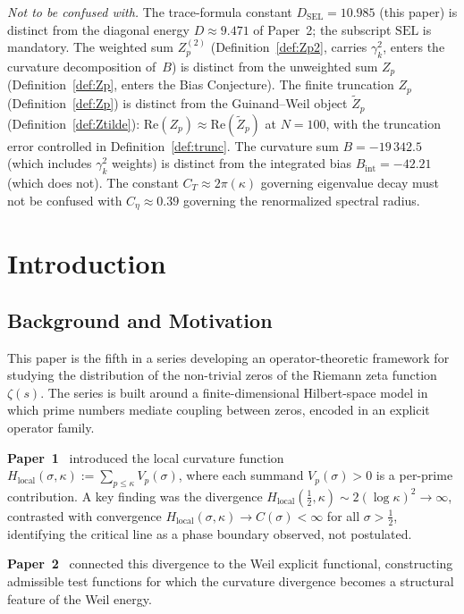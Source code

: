 \documentclass[11pt]{article}
\newcommand{\Hlocal}{H_{\mathrm{local}}}
\newcommand{\Zt}{\widetilde{Z}}
\newcommand{\DSEL}{D_{\mathrm{SEL}}}
\newcommand{\Ceta}{C_{\eta}}
\newcommand{\CT}{C_{T}}
\begin{document}
\medskip
\emph{Not to be confused with.}
The trace-formula constant $\DSEL=10.985$ (this paper) is distinct
from the diagonal energy $D\approx 9.471$ of Paper~2; the subscript
$\mathrm{SEL}$ is mandatory.
The weighted sum $Z_p^{(2)}$ (Definition~\ref{def:Zp2}, carries
$\gamma_k^2$, enters the curvature decomposition of~$B$) is distinct
from the unweighted sum $Z_p$ (Definition~\ref{def:Zp}, enters the
Bias Conjecture).
The finite truncation $Z_p$ (Definition~\ref{def:Zp}) is distinct from
the Guinand--Weil object $\Zt_p$ (Definition~\ref{def:Ztilde}):
$\mathrm{Re}(Z_p)\approx\mathrm{Re}(\Zt_p)$ at $N=100$, with the
truncation error controlled in Definition~\ref{def:trunc}.
The curvature sum $B=-19\,342.5$ (which includes
$\gamma_k^2$ weights) is distinct from the integrated bias
$B_{\mathrm{int}}=-42.21$ (which does not).
The constant $\CT\approx 2\pi(\kappa)$ governing eigenvalue decay
must not be confused with $\Ceta\approx 0.39$ governing the
renormalized spectral radius.

\newpage

\section{Introduction}
\label{sec:intro}

\subsection{Background and Motivation}

This paper is the fifth in a series developing an operator-theoretic
framework for studying the distribution of the non-trivial zeros of the
Riemann zeta function $\zeta(s)$. The series is built around a
finite-dimensional Hilbert-space model in which prime numbers
mediate coupling between zeros, encoded in an explicit operator family.

\textbf{Paper~1}~\cite{Paper1} introduced the local curvature function
$\Hlocal(\sigma,\kappa) := \sum_{p\leq\kappa}V_p(\sigma)$,
where each summand $V_p(\sigma)>0$ is a per-prime contribution.
A key finding was the divergence
$\Hlocal(\tfrac{1}{2},\kappa)\sim 2(\log\kappa)^2\to\infty$,
contrasted with convergence $\Hlocal(\sigma,\kappa)\to C(\sigma)<\infty$
for all $\sigma>\tfrac{1}{2}$, identifying the critical line as a phase
boundary observed, not postulated.

\textbf{Paper~2}~\cite{Paper2} connected this divergence to the Weil
explicit functional, constructing admissible test functions
for which the curvature divergence becomes a structural feature of
the Weil energy.
\end{document}
